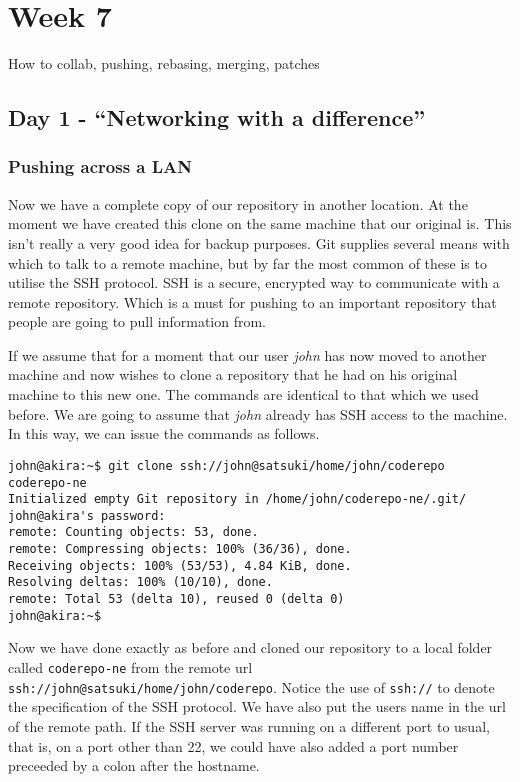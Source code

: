 \cleardoublepage
\chapter{Week 7}

How to collab, pushing, rebasing, merging, patches

\section{Day 1 - ``Networking with a difference''}
\subsection{Pushing across a LAN}

Now we have a complete copy of our repository in another location.  At the moment we have created this clone on the same machine that our original is.  This isn't really a very good idea for backup purposes.  Git supplies several means with which to talk to a remote machine, but by far the most common of these is to utilise the SSH protocol.  SSH is a secure, encrypted way to communicate with a remote repository.  Which is a must for pushing to an important repository that people are going to pull information from.

If we assume that for a moment that our user \emph{john} has now moved to another machine and now wishes to clone a repository that he had on his original machine to this new one.  The commands are identical to that which we used before.  We are going to assume that \emph{john} already has SSH access to the machine.  In this way, we can issue the commands as follows.

\begin{Verbatim}[frame=leftline,framerule=1mm,fontsize=\relsize{-3}] 
john@akira:~$ git clone ssh://john@satsuki/home/john/coderepo coderepo-ne
Initialized empty Git repository in /home/john/coderepo-ne/.git/
john@akira's password: 
remote: Counting objects: 53, done.
remote: Compressing objects: 100% (36/36), done.
Receiving objects: 100% (53/53), 4.84 KiB, done.
Resolving deltas: 100% (10/10), done.
remote: Total 53 (delta 10), reused 0 (delta 0)
john@akira:~$ 
\end{Verbatim}

Now we have done exactly as before and cloned our repository to a local folder called \texttt{coderepo-ne} from the remote url \texttt{ssh://john@satsuki/home/john/coderepo}.  Notice the use of \texttt{ssh://} to denote the specification of the SSH protocol.  We have also put the users name in the url of the remote path.  If the SSH server was running on a different port to usual, that is, on a port other than 22, we could have also added a port number preceeded by a colon after the hostname.

